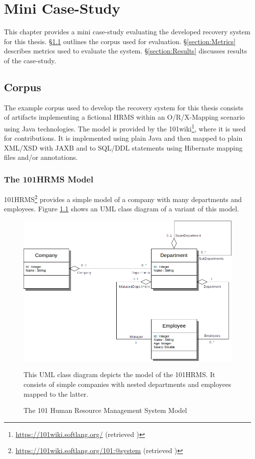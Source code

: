 \chapter{Mini Case-Study}
\label{chapter:MiniCaseStudy}
This chapter provides a mini case-study evaluating the developed recovery system for this thesis.
§\ref{section:ExampleCorpus} outlines the corpus used for evaluation.
§\ref{section:Metrics} describes metrics used to evaluate the system.
§\ref{section:Results} discusses results of the case-study.

\section{Corpus}
\label{section:ExampleCorpus}
The example corpus used to develop the recovery system for this thesis consists of artifacts implementing a fictional \gls{HRMS} within an \gls{O/R/X-Mapping} scenario using \gls{Java} technologies.
The model is provided by the 101wiki\footnote{\url{https://101wiki.softlang.org/} (retrieved )}, where it is used for contributions.
It is implemented using plain \Gls{Java} and then mapped to plain \gls{XML}/\gls{XSD} with \gls{JAXB} and to \gls{SQL/DDL} statements using \gls{Hibernate} mapping files and/or annotations.



\subsection{The 101HRMS Model}
\gls{101HRMS}\footnote{\url{https://101wiki.softlang.org/101:@system} (retrieved )} provides a simple model of a company with many departments and employees.
Figure \ref{figure:101HRMSModel} shows an \gls{UML} class diagram of a variant of this model.

\begin{figure}[h!]
\begin{center}
\includegraphics[scale=.5]{images/101HRMSModel.png}
\end{center}
{
\scriptsize 
This \gls{UML} class diagram depicts the model of the \gls{101HRMS}.
It consists of simple companies with nested departments and employees mapped to the latter.
}
\caption{The 101 Human Resource Management System Model}
\label{figure:101HRMSModel}
\end{figure}

